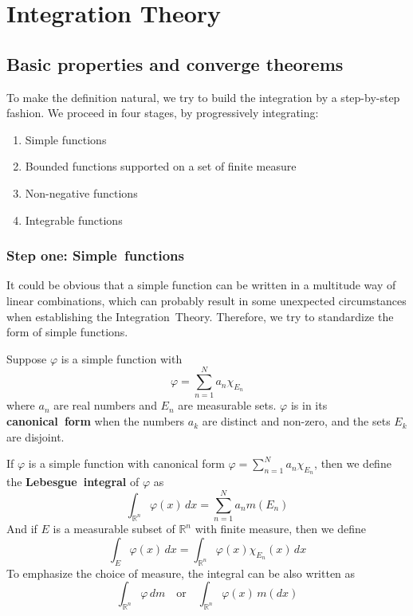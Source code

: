 \documentclass{ctexbook}
\begin{document}
\chapter{Integration Theory}

\section{Basic properties and converge theorems}

To make the definition natural, we try to build the integration by a step-by-step fashion. We proceed in four stages, by
progressively integrating:
\begin{enumerate}
    \item Simple functions
    \item Bounded functions supported on a set of finite measure
    \item Non-negative functions
    \item Integrable functions
\end{enumerate}

\subsection{Step one: Simple~functions}

It could be obvious that a simple function can be written in a multitude way of linear combinations, which can probably result in some
unexpected circumstances when establishing the Integration~Theory. Therefore, we try to standardize the form of simple functions.

\begin{define}
    Suppose $\varphi$ is a simple function with
    \[\varphi = \sum\limits_{n=1}^N a_n\chi_{E_n}\]
    where $a_n$ are real numbers and $E_n$ are measurable sets.
    $\varphi$ is in its \textbf{canonical~form} when the numbers $a_k$ are distinct and non-zero, and the sets $E_k$ are disjoint.
\end{define}

\begin{define}
    If $\varphi$ is a simple function with canonical form $\varphi = \sum_{n=1}^N a_n\chi_{E_n}$, then we define the \textbf{Lebesgue~integral}
    of $\varphi$ as 
    \[\int_{\mathbb{R}^n} \varphi(x)\,dx = \sum_{n=1}^N a_nm(E_n)\]
    And if $E$ is a measurable subset of $\mathbb{R}^n$ with finite measure, then we define
    \[\int_{E} \varphi(x)\,dx = \int_{\mathbb{R}^n} \varphi(x)\chi_{E_n}(x)\,dx\]
    To emphasize the choice of measure, the integral can be also written as
    \[\int_{\mathbb{R}^n} \varphi\,dm \quad \text{or} \quad \int_{\mathbb{R}^n} \varphi(x)\,m(dx)\]
\end{define}
\end{document}
